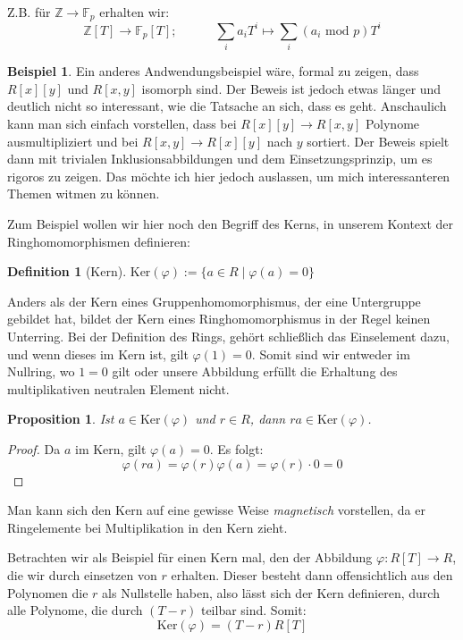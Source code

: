 \documentclass{article}
\newtheorem*{prop}{Proposition}
\theoremstyle{definition}
\newtheorem*{definition}{Definition}
\newtheorem*{zb}{Beispiel}
\theoremstyle{remark}
\begin{document}
Z.B. für $\mathbb Z \to\mathbb F_p$ erhalten wir:
\[\mathbb Z[T] \to\mathbb F_p[T]; \hspace{3em} \sum_i a_i T^i \longmapsto \sum_i (a_i \text{ mod } p) T^i\]

\begin{zb}
Ein anderes Andwendungsbeispiel wäre, formal zu zeigen, dass $R[x][y]$ und $R[x,y]$ isomorph sind. Der Beweis
ist jedoch etwas länger und deutlich nicht so interessant, wie die Tatsache an sich, dass es geht. Anschaulich
kann man sich einfach vorstellen, dass bei $R[x][y]\to R[x,y]$ Polynome ausmultipliziert und bei
$R[x,y]\to R[x][y]$ nach $y$ sortiert. Der Beweis spielt dann mit trivialen Inklusionsabbildungen und dem
Einsetzungsprinzip, um es rigoros zu zeigen. Das möchte ich hier jedoch auslassen, um mich interessanteren
Themen witmen zu können.
\end{zb}

Zum Beispiel wollen wir hier noch den Begriff des Kerns, in unserem Kontext der Ringhomomorphismen definieren:
\begin{definition}[Kern]
    $\mathrm{Ker}(\varphi) := \{a\in R \mid \varphi(a)=0\}$
\end{definition}

Anders als der Kern eines Gruppenhomomorphismus, der eine Untergruppe gebildet hat, bildet der Kern eines
Ringhomomorphismus in der Regel keinen Unterring. Bei der Definition des Rings, gehört schließlich das
Einselement dazu, und wenn dieses im Kern ist, gilt $\varphi(1)=0$. Somit sind wir entweder im Nullring, wo
$1=0$ gilt oder unsere Abbildung erfüllt die Erhaltung des multiplikativen neutralen Element nicht.

\begin{prop} Ist $a\in \mathrm{Ker}(\varphi)$ und $r\in R$, dann $ra\in \mathrm{Ker}(\varphi)$.\end{prop}
\begin{proof} Da $a$ im Kern, gilt $\varphi(a)=0$. Es folgt:
    \[\varphi(ra)=\varphi(r)\varphi(a)=\varphi(r)\cdot0=0\]
\end{proof}
Man kann sich den Kern auf eine gewisse Weise \emph{magnetisch} vorstellen, da er Ringelemente bei
Multiplikation in den Kern zieht.

\vspace{0.7em}
Betrachten wir als Beispiel für einen Kern mal, den der Abbildung $\varphi: R[T]\to R$, die wir durch
einsetzen von $r$ erhalten. Dieser besteht dann offensichtlich aus den Polynomen die $r$ als Nullstelle haben,
also lässt sich der Kern definieren, durch alle Polynome, die durch $(T-r)$ teilbar sind. Somit:
\[\mathrm{Ker}(\varphi)=(T-r)R[T]\]
\end{document}
